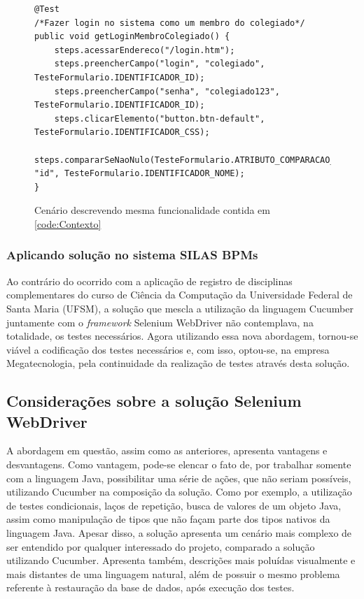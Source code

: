 \documentclass[tg]{mdtufsm}
\begin{document}
\begin{figure}[!htt]
	\begin{lstlisting}
@Test
/*Fazer login no sistema como um membro do colegiado*/
public void getLoginMembroColegiado() {
    steps.acessarEndereco("/login.htm");
    steps.preencherCampo("login", "colegiado", TesteFormulario.IDENTIFICADOR_ID);
    steps.preencherCampo("senha", "colegiado123", TesteFormulario.IDENTIFICADOR_ID);
    steps.clicarElemento("button.btn-default", TesteFormulario.IDENTIFICADOR_CSS);
    steps.compararSeNaoNulo(TesteFormulario.ATRIBUTO_COMPARACAO_ASSERT_NOME_TAG, "id", TesteFormulario.IDENTIFICADOR_NOME);
}
	\end{lstlisting}
	\caption{Cenário descrevendo mesma funcionalidade contida em \ref{code:Contexto}}
	\label{code:seleniumPiec}
\end{figure}

\subsubsection{Aplicando solução no sistema SILAS BPMs}
Ao contrário do ocorrido com a aplicação de registro de disciplinas complementares do curso de Ciência da Computação da Universidade Federal de Santa Maria (UFSM), a solução que mescla a utilização da linguagem Cucumber juntamente com o \emph{framework} Selenium WebDriver não contemplava, na totalidade, os testes necessários. Agora utilizando essa nova abordagem, tornou-se viável a codificação dos testes necessários e, com isso, optou-se, na empresa Megatecnologia, pela continuidade da realização de testes através desta solução.

\subsection{Considerações sobre a solução Selenium WebDriver}
A abordagem em questão, assim como as anteriores, apresenta vantagens e desvantagens. Como vantagem, pode-se elencar o fato de, por trabalhar somente com a linguagem Java, possibilitar uma série de ações, que não seriam possíveis, utilizando Cucumber na composição da solução. Como por exemplo, a utilização de testes condicionais, laços de repetição, busca de valores de um objeto Java, assim como manipulação de tipos que não façam parte dos tipos nativos da linguagem Java. Apesar disso, a solução apresenta um cenário mais complexo de ser entendido por qualquer interessado do projeto, comparado a solução utilizando Cucumber. Apresenta também, descrições mais poluídas visualmente e mais distantes de uma linguagem natural, além de possuir o mesmo problema referente à restauração da base de dados, após execução dos testes.
\end{document}
